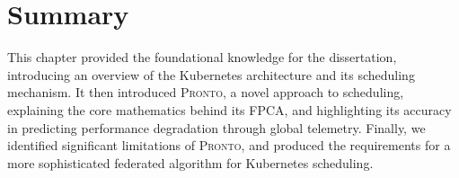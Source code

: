 \section{Summary}
This chapter provided the foundational knowledge for the dissertation,
introducing an overview of the Kubernetes architecture and its scheduling
mechanism. It then introduced \textsc{Pronto}, a novel approach to scheduling,
explaining the core mathematics behind its FPCA, and highlighting its accuracy
in predicting performance degradation through global telemetry. Finally, we
identified significant limitations of \textsc{Pronto}, and produced the
requirements for a more sophisticated federated algorithm for Kubernetes scheduling.

